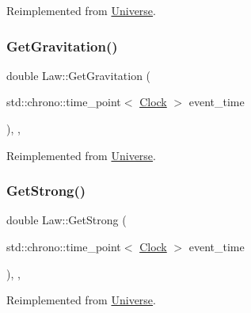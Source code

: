Reimplemented from \mbox{\hyperlink{classUniverse_a9f099605c082e7fa755787a6a8cab7ba}{Universe}}.

\mbox{\label{classLaw_a84bdc0c2ca97a9c19422018ff761b992}} 
\subsubsection{\texorpdfstring{Get\+Gravitation()}{GetGravitation()}}
{\footnotesize\ttfamily double Law\+::\+Get\+Gravitation (\begin{DoxyParamCaption}\item[{std\+::chrono\+::time\+\_\+point$<$ \mbox{\hyperlink{universe_8h_a0ef8d951d1ca5ab3cfaf7ab4c7a6fd80}{Clock}} $>$}]{event\+\_\+time }\end{DoxyParamCaption})\hspace{0.3cm}{\ttfamily [inline]}, {\ttfamily [final]}, {\ttfamily [virtual]}}



Reimplemented from \mbox{\hyperlink{classUniverse_ab0404e774ee0ed66b597ff5b8e989446}{Universe}}.

\mbox{\label{classLaw_afd94bf09dbaf5d5df36b8f093db02dd9}} 
\subsubsection{\texorpdfstring{Get\+Strong()}{GetStrong()}}
{\footnotesize\ttfamily double Law\+::\+Get\+Strong (\begin{DoxyParamCaption}\item[{std\+::chrono\+::time\+\_\+point$<$ \mbox{\hyperlink{universe_8h_a0ef8d951d1ca5ab3cfaf7ab4c7a6fd80}{Clock}} $>$}]{event\+\_\+time }\end{DoxyParamCaption})\hspace{0.3cm}{\ttfamily [inline]}, {\ttfamily [final]}, {\ttfamily [virtual]}}



Reimplemented from \mbox{\hyperlink{classUniverse_acb453ce71da418c5b5617fecede9571b}{Universe}}.

\mbox{\label{classLaw_afcdbea76524e5a52691fff7b526971e9}} 
